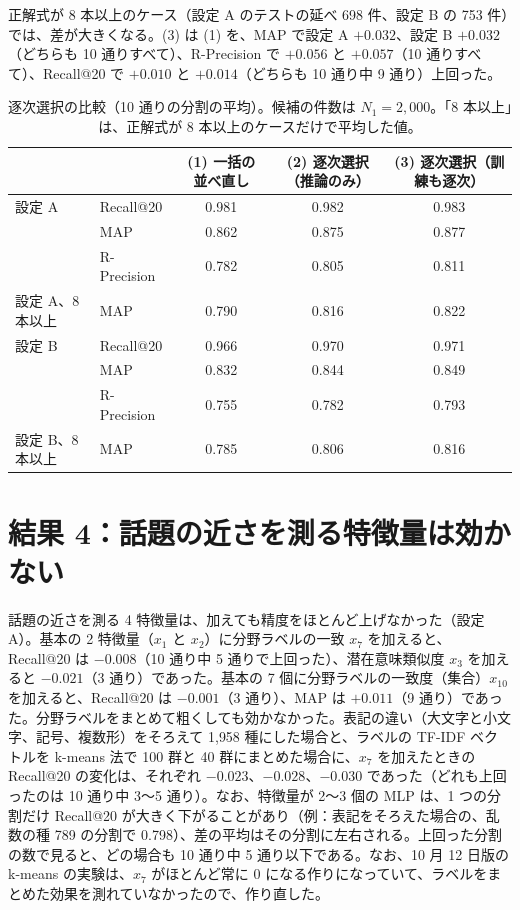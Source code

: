 \documentclass[11pt,a4paper]{ltjsarticle}
\begin{document}
正解式が 8 本以上のケース（設定 A のテストの延べ 698 件、設定 B の 753 件）では、差が大きくなる。(3) は (1) を、MAP で設定 A $+0.032$、設定 B $+0.032$（どちらも 10 通りすべて）、R-Precision で $+0.056$ と $+0.057$（10 通りすべて）、Recall@20 で $+0.010$ と $+0.014$（どちらも 10 通り中 9 通り）上回った。

\begin{table}[t]\centering
\caption{逐次選択の比較（10 通りの分割の平均）。候補の件数は $N_1 = 2{,}000$。「8 本以上」は、正解式が 8 本以上のケースだけで平均した値。}
\label{tab:greedy}
\footnotesize
\setlength{\tabcolsep}{4pt}
\begin{tabular}{@{}llccc@{}}
\toprule
 & & (1) 一括の並べ直し & (2) 逐次選択（推論のみ） & (3) 逐次選択（訓練も逐次） \\
\midrule
設定 A & Recall@20 & 0.981 & 0.982 & 0.983 \\
 & MAP & 0.862 & 0.875 & 0.877 \\
 & R-Precision & 0.782 & 0.805 & 0.811 \\
設定 A、8 本以上 & MAP & 0.790 & 0.816 & 0.822 \\
\midrule
設定 B & Recall@20 & 0.966 & 0.970 & 0.971 \\
 & MAP & 0.832 & 0.844 & 0.849 \\
 & R-Precision & 0.755 & 0.782 & 0.793 \\
設定 B、8 本以上 & MAP & 0.785 & 0.806 & 0.816 \\
\bottomrule
\end{tabular}
\end{table}

\section{結果 4：話題の近さを測る特徴量は効かない}\label{sec:topic}
話題の近さを測る 4 特徴量は、加えても精度をほとんど上げなかった（設定 A）。基本の 2 特徴量（$x_1$ と $x_2$）に分野ラベルの一致 $x_7$ を加えると、Recall@20 は $-0.008$（10 通り中 5 通りで上回った）、潜在意味類似度 $x_3$ を加えると $-0.021$（3 通り）であった。基本の 7 個に分野ラベルの一致度（集合）$x_{10}$ を加えると、Recall@20 は $-0.001$（3 通り）、MAP は $+0.011$（9 通り）であった。分野ラベルをまとめて粗くしても効かなかった。表記の違い（大文字と小文字、記号、複数形）をそろえて 1{,}958 種にした場合と、ラベルの TF-IDF ベクトルを k-means 法で 100 群と 40 群にまとめた場合に、$x_7$ を加えたときの Recall@20 の変化は、それぞれ $-0.023$、$-0.028$、$-0.030$ であった（どれも上回ったのは 10 通り中 3〜5 通り）。なお、特徴量が 2〜3 個の MLP は、1 つの分割だけ Recall@20 が大きく下がることがあり（例：表記をそろえた場合の、乱数の種 789 の分割で 0.798）、差の平均はその分割に左右される。上回った分割の数で見ると、どの場合も 10 通り中 5 通り以下である。なお、10 月 12 日版の k-means の実験は、$x_7$ がほとんど常に 0 になる作りになっていて、ラベルをまとめた効果を測れていなかったので、作り直した。
\end{document}
